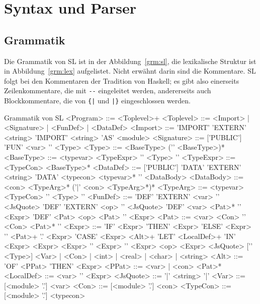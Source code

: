 \documentclass[runningheads]{llncs}
\begin{document}
\section{Syntax und Parser}
\label{sec:syntax}

\subsection{Grammatik}

Die Grammatik von SL ist in der Abbildung~\ref{grm:sl}, die
lexikalische Struktur ist in Abbildung~\ref{grm:lex} aufgelistet. Nicht erwähnt
darin sind die Kommentare.  SL folgt bei den Kommentaren der Tradition
von Haskell; es gibt also einerseits Zeilenkommentare,
die  mit \verb|--| eingeleitet werden, andererseits auch Blockkommentare, die
von \verb:{|: und \verb:|}: eingeschlossen werden.

\begin{grammarfigure}[grm:sl]{Grammatik von SL}
<Program>   ::= <Toplevel>+
<Toplevel>  ::= <Import> | <Signature> | <FunDef> | <DataDef>
<Import>    ::= 'IMPORT' 'EXTERN' <string>
           \alt 'IMPORT' <string> 'AS' <module>
<Signature> ::= ['PUBLIC'] 'FUN' <var> '\colon' <Type>
<Type>      ::= <BaseType> ('\arrow' <BaseType>)*
<BaseType>  ::= <typevar> 
           \alt <TypeExpr> 
           \alt '\open' <Type> '\close'
<TypeExpr>  ::= <TypeCon> <BaseType>*
<DataDef>   ::= ['PUBLIC'] 'DATA' 'EXTERN' <string>
           \alt ['PUBLIC'] 'DATA' <typecon> <typevar>* '\eq' <DataBody>
<DataBody>  ::= <con> <TypeArg>* ('\bar' <con> <TypeArg>*)*
<TypeArg>   ::= <typevar>
           \alt <TypeCon>
           \alt '\open' <Type> '\close'
<FunDef>    ::= 'DEF' 'EXTERN' <var> '\eq' <JsQuote>
           \alt 'DEF' 'EXTERN' <op> '\eq' <JsQuote>
           \alt 'DEF' <var> <Pat>* '\eq' <Expr>
           \alt 'DEF' <Pat> <op> <Pat> '\eq' <Expr>
<Pat>       ::= <var>
           \alt <Con>
           \alt '\open' <Con> <Pat>* '\close'
<Expr>      ::= 'IF' <Expr> 'THEN' <Expr> 'ELSE' <Expr>
           \alt '\lam' <Pat>+ '.' <Expr>
           \alt 'CASE' <Expr> <Alt>+
           \alt 'LET' <LocalDef>+ 'IN' <Expr>
           \alt <Expr> <Expr>
           \alt '\open' <Expr> '\close'
           \alt <Expr> <op> <Expr>
           \alt <JsQuote> ['\colon' <Type>]
           \alt <Var> | <Con> | <int> | <real> | <char> | <string>
<Alt>       ::= 'OF' <PPat> 'THEN' <Expr>
<PPat>      ::= <var> | <con> <Pat>*
<LocalDef>  ::= <var> '\eq' <Expr>
<JsQuote>   ::= '\bropen\bar' <string> '\bar\brclose'
<Var>       ::= [<module> '.'] <var>
<Con>       ::= [<module> '.'] <con>
<TypeCon>   ::= [<module> '.'] <typecon>
\end{grammarfigure}
\end{document}
